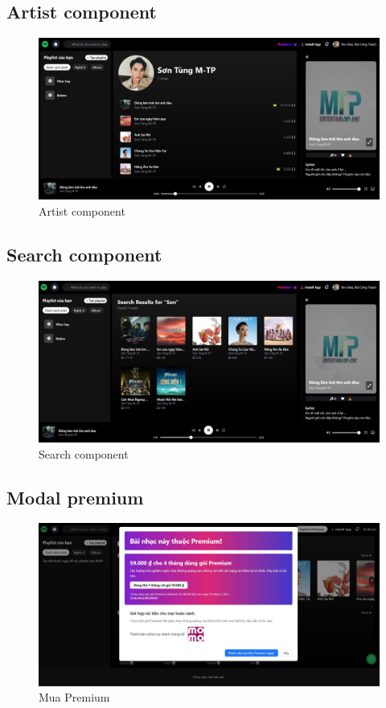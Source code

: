 \documentclass[a4paper]{article}
\begin{document}
\subsection{Artist component}
\begin{figure}[H]
    \centering
    \includegraphics[width=1\linewidth]{img/artist.jpg}
    \caption{Artist component}
    \label{fig:enter-label}
\end{figure}

\subsection{Search component}
\begin{figure}[H]
    \centering
    \includegraphics[width=1\linewidth]{img/search.jpg}
    \caption{Search component}
    \label{fig:enter-label}
\end{figure}

\subsection{Modal premium}
\begin{figure}[H]
    \centering
    \includegraphics[width=1\linewidth]{img/payPremium.png}
    \caption{Mua Premium}
    \label{fig:enter-label}
\end{figure}
\end{document}

